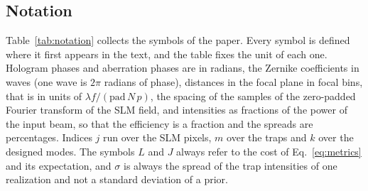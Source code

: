 \subsection{Notation}

Table~\ref{tab:notation} collects the symbols of the paper. Every symbol is defined where it first appears in the text, and the table fixes the unit of each one. Hologram phases and aberration phases are in radians, the Zernike coefficients in waves (one wave is $2\pi$ radians of phase), distances in the focal plane in focal bins, that is in units of $\lambda f/(\mathrm{pad}\,N\,p)$, the spacing of the samples of the zero-padded Fourier transform of the SLM field, and intensities as fractions of the power of the input beam, so that the efficiency is a fraction and the spreads are percentages. Indices $j$ run over the SLM pixels, $m$ over the traps and $k$ over the designed modes. The symbols $L$ and $J$ always refer to the cost of Eq.~\eqref{eq:metrics} and its expectation, and $\sigma$ is always the spread of the trap intensities of one realization and not a standard deviation of a prior.

